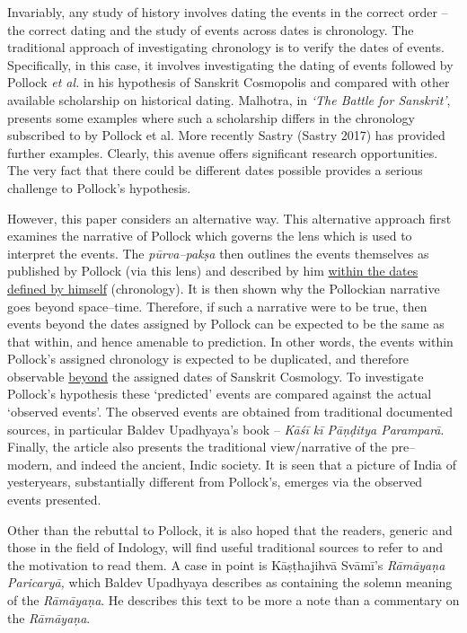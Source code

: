 Invariably, any study of history involves dating the events in the correct order – the correct dating and the study of events across dates is chronology. The traditional approach of investigating chronology is to verify the dates of events. Specifically, in this case, it involves investigating the dating of events followed by Pollock \textit{et al.} in his hypothesis of Sanskrit Cosmopolis and compared with other available scholarship on historical dating. Malhotra, in \textit{‘The Battle for Sanskrit’}, presents some examples where such a scholarship differs in the chronology subscribed to by Pollock et al. More recently Sastry (Sastry 2017) has provided further examples. Clearly, this avenue offers significant research opportunities. The very fact that there could be different dates possible provides a serious challenge to Pollock’s hypothesis.

However, this paper considers an alternative way. This alternative approach first examines the narrative of Pollock which governs the lens which is used to interpret the events. The \textit{pūrva–pakṣa} then outlines the events themselves as published by Pollock (via this lens) and described by him \underline{within the dates defined by himself} (chronology). It is then shown why the Pollockian narrative goes beyond space–time. Therefore, if such a narrative were to be true, then events beyond the dates assigned by Pollock can be expected to be the same as that within, and hence amenable to prediction. In other words, the events within Pollock’s assigned chronology is expected to be duplicated, and therefore observable \underline{beyond} the assigned dates of Sanskrit Cosmology. To investigate Pollock’s hypothesis these ‘predicted’ events are compared against the actual ‘observed events’. The observed events are obtained from traditional documented sources, in particular Baldev Upadhyaya’s book – \textit{Kāśī kī Pāṇḍitya Paramparā}. Finally, the article also presents the traditional view/narrative of the pre–modern, and indeed the ancient, Indic society. It is seen that a picture of India of yesteryears, substantially different from Pollock’s, emerges via the observed events presented.

Other than the rebuttal to Pollock, it is also hoped that the readers, generic and those in the field of Indology, will find useful traditional sources to refer to and the motivation to read them. A case in point is Kāṣṭhajihvā Svāmī’s \textit{Rāmāyaṇa Paricaryā,} which Baldev Upadhyaya describes as containing the solemn meaning of the \textit{Rāmāyaṇa}. He describes this text to be more a note than a commentary on the \textit{Rāmāyaṇa}.



